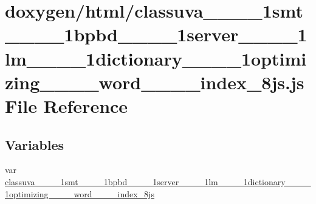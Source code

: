 \hypertarget{classuva____1____1smt____1____1bpbd____1____1server____1____1lm____1____1dictionary____1____1opt09c83f2a7f6477dd08d3f885ba6e5da2}{}\section{doxygen/html/classuva\+\_\+\+\_\+\_\+\+\_\+1smt\+\_\+\+\_\+\_\+\+\_\+1bpbd\+\_\+\+\_\+\_\+\+\_\+1server\+\_\+\+\_\+\_\+\+\_\+1lm\+\_\+\+\_\+\_\+\+\_\+1dictionary\+\_\+\+\_\+\_\+\+\_\+1optimizing\+\_\+\+\_\+\+\_\+\+\_\+word\+\_\+\+\_\+\+\_\+\+\_\+index\+\_\+8js.js File Reference}
\label{classuva____1____1smt____1____1bpbd____1____1server____1____1lm____1____1dictionary____1____1opt09c83f2a7f6477dd08d3f885ba6e5da2}
\subsection*{Variables}
\begin{DoxyCompactItemize}
\item 
var \hyperlink{classuva____1____1smt____1____1bpbd____1____1server____1____1lm____1____1dictionary____1____1opt09c83f2a7f6477dd08d3f885ba6e5da2_ac1818a408b87246e66938bbbd1c7b1f8}{classuva\+\_\+\+\_\+\_\+\+\_\+1smt\+\_\+\+\_\+\_\+\+\_\+1bpbd\+\_\+\+\_\+\_\+\+\_\+1server\+\_\+\+\_\+\_\+\+\_\+1lm\+\_\+\+\_\+\_\+\+\_\+1dictionary\+\_\+\+\_\+\_\+\+\_\+1optimizing\+\_\+\+\_\+\+\_\+\+\_\+word\+\_\+\+\_\+\+\_\+\+\_\+index\+\_\+8js}
\end{DoxyCompactItemize}


